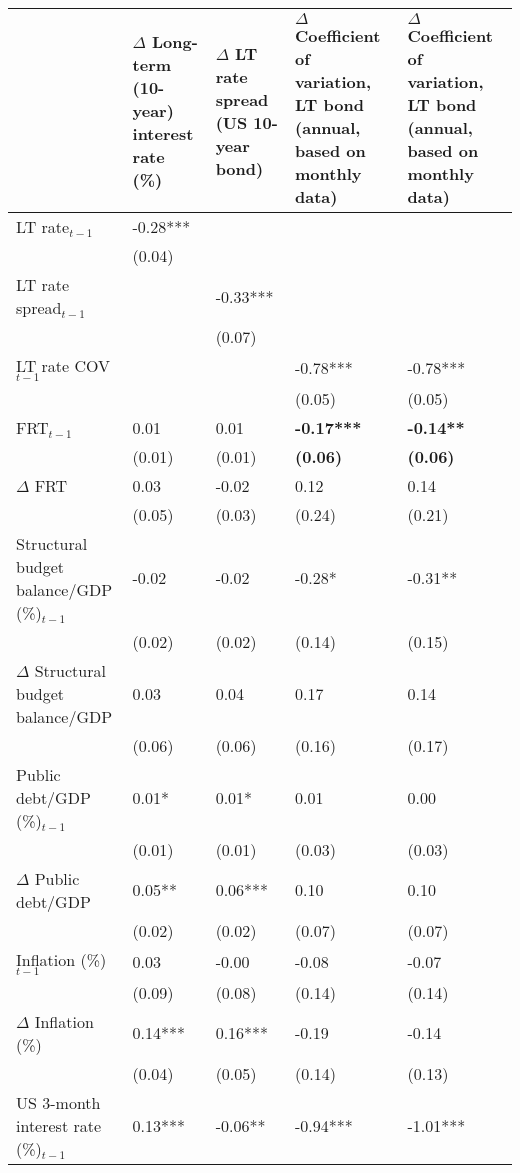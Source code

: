 {\tiny
\begin{tabular}{lp{2cm}p{2cm}p{2cm}p{2cm}}
  \hline
 & $\Delta$ Long-term (10-year) interest rate (\%) & $\Delta$ LT rate spread (US 10-year bond) & $\Delta$ Coefficient of variation, LT bond (annual, based on monthly data) & $\Delta$ Coefficient of variation, LT bond (annual, based on monthly data) \\ 
  \hline
LT rate$_{t-1}$ & -0.28*** &  &  &  \\ 
   & (0.04) &  &  &  \\ 
  LT rate spread$_{t-1}$ &  & -0.33*** &  &  \\ 
   &  & (0.07) &  &  \\ 
  LT rate COV$_{t-1}$ &  &  & -0.78*** & -0.78*** \\ 
   &  &  & (0.05) & (0.05) \\ 
  FRT$_{t-1}$ & 0.01 & 0.01 & \textbf{-0.17***} & \textbf{-0.14**} \\ 
   & (0.01) & (0.01) & \textbf{(0.06)} & \textbf{(0.06)} \\ 
  $\Delta$ FRT & 0.03 & -0.02 & 0.12 & 0.14 \\ 
   & (0.05) & (0.03) & (0.24) & (0.21) \\ 
  Structural budget balance/GDP (\%)$_{t-1}$ & -0.02 & -0.02 & -0.28* & -0.31** \\ 
   & (0.02) & (0.02) & (0.14) & (0.15) \\ 
  $\Delta$ Structural budget balance/GDP & 0.03 & 0.04 & 0.17 & 0.14 \\ 
   & (0.06) & (0.06) & (0.16) & (0.17) \\ 
  Public debt/GDP (\%)$_{t-1}$ & 0.01* & 0.01* & 0.01 & 0.00 \\ 
   & (0.01) & (0.01) & (0.03) & (0.03) \\ 
  $\Delta$ Public debt/GDP & 0.05** & 0.06*** & 0.10 & 0.10 \\ 
   & (0.02) & (0.02) & (0.07) & (0.07) \\ 
  Inflation (\%) $_{t-1}$ & 0.03 & -0.00 & -0.08 & -0.07 \\ 
   & (0.09) & (0.08) & (0.14) & (0.14) \\ 
  $\Delta$ Inflation (\%) & 0.14*** & 0.16*** & -0.19 & -0.14 \\ 
   & (0.04) & (0.05) & (0.14) & (0.13) \\ 
  US 3-month interest rate (\%)$_{t-1}$ & 0.13*** & -0.06** & -0.94*** & -1.01*** \\ 

\end{tabular}}
